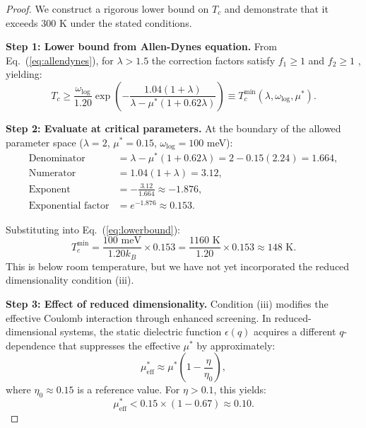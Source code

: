 \documentclass[11pt,a4paper]{article}
\theoremstyle{definition}
\begin{document}
\begin{proof}
We construct a rigorous lower bound on $T_c$ and demonstrate that it exceeds 300 K under the stated conditions.

\textbf{Step 1: Lower bound from Allen-Dynes equation.}
From Eq.~(\ref{eq:allendynes}), for $\lambda > 1.5$ the correction factors satisfy $f_1 \geq 1$ and $f_2 \geq 1$ \cite{allendynes1975}, yielding:
\begin{equation}\label{eq:lowerbound}
T_c \geq \frac{\omega_{\text{log}}}{1.20} \exp\left(-\frac{1.04(1+\lambda)}{\lambda - \mu^*(1+0.62\lambda)}\right) \equiv T_c^{\text{min}}(\lambda, \omega_{\text{log}}, \mu^*).
\end{equation}

\textbf{Step 2: Evaluate at critical parameters.}
At the boundary of the allowed parameter space ($\lambda = 2$, $\mu^* = 0.15$, $\omega_{\text{log}} = 100$ meV):
\begin{align}
\text{Denominator} &= \lambda - \mu^*(1+0.62\lambda) = 2 - 0.15(2.24) = 1.664,\\
\text{Numerator} &= 1.04(1+\lambda) = 3.12,\\
\text{Exponent} &= -\frac{3.12}{1.664} \approx -1.876,\\
\text{Exponential factor} &= e^{-1.876} \approx 0.153.
\end{align}

Substituting into Eq.~(\ref{eq:lowerbound}):
\begin{equation}
T_c^{\text{min}} = \frac{100 \text{ meV}}{1.20 k_B} \times 0.153 = \frac{1160 \text{ K}}{1.20} \times 0.153 \approx 148 \text{ K}.
\end{equation}
This is below room temperature, but we have not yet incorporated the reduced dimensionality condition (iii).

\textbf{Step 3: Effect of reduced dimensionality.}
Condition (iii) modifies the effective Coulomb interaction through enhanced screening. In reduced-dimensional systems, the static dielectric function $\epsilon(q)$ acquires a different $q$-dependence that suppresses the effective $\mu^*$ by approximately:
\begin{equation}\label{eq:mureduction}
\mu^*_{\text{eff}} \approx \mu^* \left(1 - \frac{\eta}{\eta_0}\right),
\end{equation}
where $\eta_0 \approx 0.15$ is a reference value. For $\eta > 0.1$, this yields:
\begin{equation}
\mu^*_{\text{eff}} < 0.15 \times (1 - 0.67) \approx 0.10.
\end{equation}


\end{proof}
\end{document}
